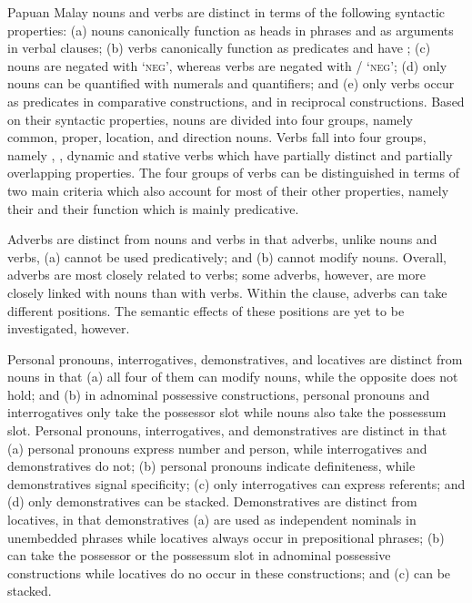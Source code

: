 Papuan Malay nouns and verbs are distinct in terms of the following syntactic properties: (a) nouns canonically function as heads in  phrases and as arguments in verbal clauses; (b) verbs canonically function as predicates and have ; (c) nouns are negated with  ‘\textsc{neg}’, whereas verbs are negated with / ‘\textsc{neg}’; (d) only nouns can be quantified with numerals and quantifiers; and (e) only verbs occur as predicates in comparative constructions, and in reciprocal constructions. Based on their syntactic properties, nouns are divided into four groups, namely common, proper, location, and direction nouns. Verbs fall into four groups, namely , ,  dynamic and  stative verbs which have partially distinct and partially overlapping properties. The four groups of verbs can be distinguished in terms of two main criteria which also account for most of their other properties, namely their  and their function which is mainly predicative.



Adverbs are distinct from nouns and verbs in that adverbs, unlike nouns and verbs, (a) cannot be used predicatively; and (b) cannot modify nouns. Overall, adverbs are most closely related to verbs; some adverbs, however, are more closely linked with nouns than with verbs. Within the clause, adverbs can take different positions. The semantic effects of these positions are yet to be investigated, however.



Personal pronouns, interrogatives, demonstratives, and locatives are distinct from nouns in that (a) all four of them can modify nouns, while the opposite does not hold; and (b) in adnominal possessive constructions, personal pronouns and interrogatives only take the possessor slot while nouns also take the possessum slot. Personal pronouns, interrogatives, and demonstratives are distinct in that (a) personal pronouns express number and person, while interrogatives and demonstratives do not; (b) personal pronouns indicate definiteness, while demonstratives signal specificity; (c) only interrogatives can express  referents; and (d) only demonstratives can be stacked. Demonstratives are distinct from locatives, in that demonstratives (a) are used as independent nominals in unembedded  phrases while locatives always occur in prepositional phrases; (b) can take the possessor or the possessum slot in adnominal possessive constructions while locatives do no occur in these constructions; and (c) can be stacked.

